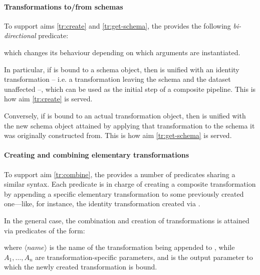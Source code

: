 \documentclass[12pt,a4paper,openright,twoside]{book}
\begin{document}
\paragraph{Transformations to/from schemas}

To support aims \ref{tr:create} and \ref{tr:get-schema}, the \mllib{} provides the following \emph{bi-directional} predicate:
%
\begin{center}
\end{center}
%
which changes its behaviour depending on which arguments are instantiated.

In particular, if  is bound to a schema object, then  is unified with an identity transformation -- i.e. a transformation leaving the schema and the dataset unaffected --, which can be used as the initial step of a composite pipeline.
%
This is how aim \ref{tr:create} is served.

Conversely, if  is bound to an actual transformation object, then  is unified with the new schema object attained by applying that transformation to the schema it was originally constructed from.
%
This is how aim \ref{tr:get-schema} is served.

\paragraph{Creating and combining elementary transformations}

To support aim \ref{tr:combine},  the \mllib{} provides a number of predicates sharing a similar syntax.
%
Each predicate is in charge of creating a composite transformation by appending a specific elementary transformation to some previously created one---like, for instance, the identity transformation created via .
%

In the general case, the combination and creation of transformations is attained via predicates of the form:
%
\begin{center}
\end{center}
%
where $\langle \mathit{name} \rangle$ is the name of the transformation being appended to , while $A_1, \ldots, A_n$ are transformation-specific parameters, and  is the output parameter to which the newly created transformation is bound.
\end{document}
